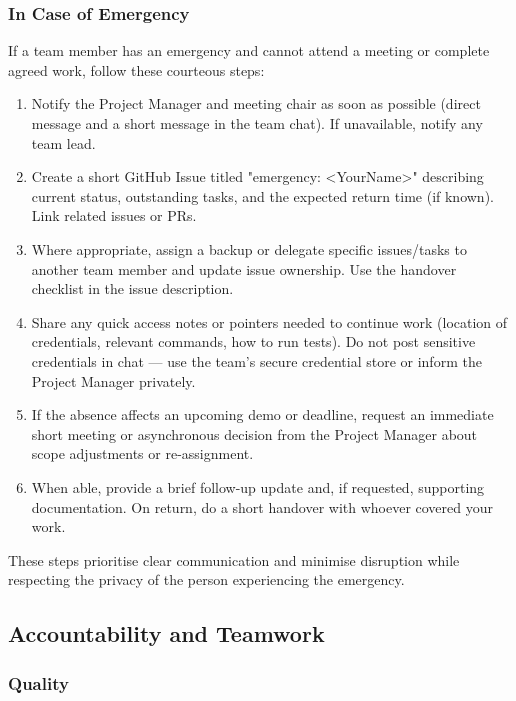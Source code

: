 \documentclass{article}
\begin{document}
\subsubsection*{In Case of Emergency}

If a team member has an emergency and cannot attend a meeting or complete agreed work, follow these courteous steps:
\begin{enumerate}
  \item Notify the Project Manager and meeting chair as soon as possible (direct message and a short message in the team chat). If unavailable, notify any team lead.
  \item Create a short GitHub Issue titled "emergency: <YourName>" describing current status, outstanding tasks, and the expected return time (if known). Link related issues or PRs.
  \item Where appropriate, assign a backup or delegate specific issues/tasks to another team member and update issue ownership. Use the handover checklist in the issue description.
  \item Share any quick access notes or pointers needed to continue work (location of credentials, relevant commands, how to run tests). Do not post sensitive credentials in chat — use the team's secure credential store or inform the Project Manager privately.
  \item If the absence affects an upcoming demo or deadline, request an immediate short meeting or asynchronous decision from the Project Manager about scope adjustments or re-assignment.
  \item When able, provide a brief follow-up update and, if requested, supporting documentation. On return, do a short handover with whoever covered your work.
\end{enumerate}

These steps prioritise clear communication and minimise disruption while respecting the privacy of the person experiencing the emergency.

\subsection*{Accountability and Teamwork}

\subsubsection*{Quality} 

\end{document}
